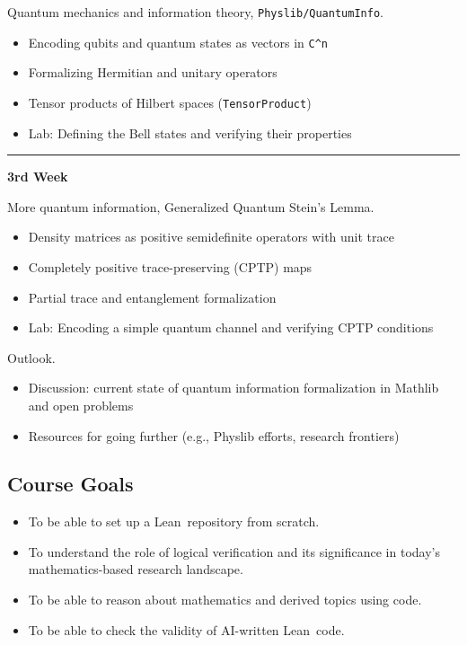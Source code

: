 \documentclass[11pt,a4paper]{article}
\newcommand{\lean}{{Lean}}
\begin{document}
\begin{description}
\begin{itemize}
    \end{itemize}
    \item[Lecture 4, 24 Sep:] Quantum mechanics and information theory, \texttt{Physlib/QuantumInfo}.
    \begin{itemize}
        \item Encoding qubits and quantum states as vectors in \verb|C^n|
        \item Formalizing Hermitian and unitary operators
        \item Tensor products of Hilbert spaces (\verb|TensorProduct|)
        \item Lab: Defining the Bell states and verifying their properties
    \end{itemize}
    \hrule
    \item\begin{center} \textbf{3rd Week} \end{center}
    \item[Lecture 5, 29 Sep:] More quantum information, Generalized Quantum Stein's Lemma.
    \begin{itemize}
        \item Density matrices as positive semidefinite operators with unit trace
        \item Completely positive trace-preserving (CPTP) maps
        \item Partial trace and entanglement formalization
        \item Lab: Encoding a simple quantum channel and verifying CPTP conditions
    \end{itemize}
    \item[Lecture 6, 01 Oct:] Outlook.
    \begin{itemize}
        \item Discussion: current state of quantum information formalization in Mathlib and open problems
        \item Resources for going further (e.g., Physlib efforts, research frontiers)
    \end{itemize}
\end{description}

\normalsize
\subsection*{Course Goals}

\begin{itemize}
  \item To be able to set up a \lean\ repository from scratch.
  \item To understand the role of logical verification and its significance in today's mathematics-based research landscape.
  \item To be able to reason about mathematics and derived topics using code.
  \item To be able to check the validity of AI-written \lean\ code.
\end{itemize}
\end{document}
